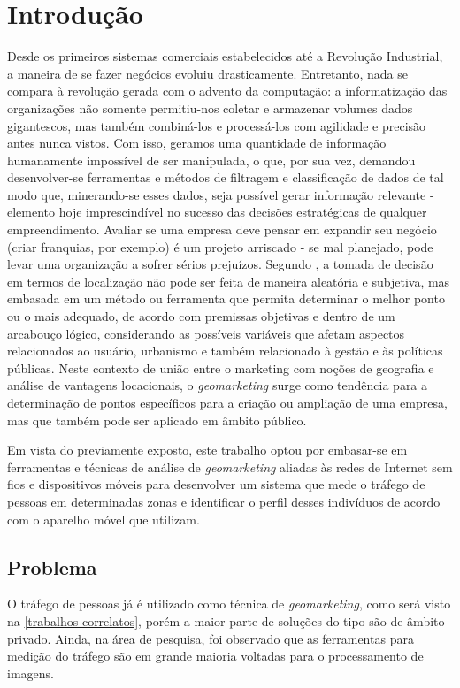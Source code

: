 
\chapter{Introdução}
\label{introducao}

Desde os primeiros sistemas comerciais estabelecidos até a Revolução Industrial,
a maneira de se fazer negócios evoluiu drasticamente. Entretanto, nada se
compara à revolução gerada com o advento da computação: a informatização das
organizações não somente permitiu-nos coletar e armazenar volumes dados
gigantescos, mas também combiná-los e processá-los com agilidade e precisão antes nunca
vistos. Com isso, geramos uma quantidade de informação humanamente impossível de
ser manipulada, o que, por sua vez, demandou desenvolver-se ferramentas e
métodos de filtragem e classificação de dados de tal modo que, minerando-se esses dados, seja possível gerar
informação relevante - elemento hoje imprescindível no sucesso
das decisões estratégicas de qualquer empreendimento. Avaliar se uma empresa
deve pensar em expandir seu negócio (criar franquias, por exemplo) é um projeto
arriscado - se mal planejado, pode levar uma organização a sofrer sérios
prejuízos. Segundo , a tomada de decisão em termos de
localização não pode ser feita de maneira aleatória e subjetiva, mas embasada em
um método ou ferramenta que permita determinar o melhor ponto ou o mais
adequado, de acordo com premissas objetivas e dentro de um arcabouço lógico,
considerando as possíveis variáveis que afetam aspectos relacionados ao usuário,
urbanismo e também relacionado à gestão e às políticas públicas. Neste contexto
de união entre o marketing com noções de geografia e análise de vantagens
locacionais, o \emph{geomarketing} surge como tendência para a determinação de
pontos específicos para a criação ou ampliação de uma empresa, mas que também pode ser aplicado em âmbito público.

Em vista do previamente exposto, este trabalho optou por embasar-se em
ferramentas e técnicas de análise de \emph{geomarketing} aliadas às redes de
Internet sem fios e dispositivos móveis para desenvolver
um sistema que mede o tráfego de pessoas em determinadas zonas e identificar o
perfil desses indivíduos de acordo com o aparelho móvel que utilizam.

\section{Problema}
O tráfego de pessoas já é utilizado como técnica de \emph{geomarketing}, como será visto na \autoref{trabalhos-correlatos}, porém
a maior parte de soluções do tipo são de âmbito privado. Ainda, na área de pesquisa, foi observado que as ferramentas para medição do tráfego
são em grande maioria voltadas para o processamento de imagens.

